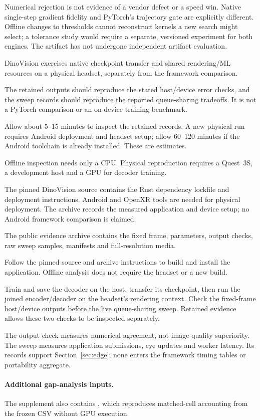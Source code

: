 Numerical rejection is not evidence of a vendor defect or a speed win.
Native single-step gradient fidelity and PyTorch's trajectory gate are
explicitly different. Offline changes to thresholds cannot reconstruct
kernels a new search might select; a tolerance study would require a separate,
versioned experiment for both engines. The artifact has not undergone
independent artifact evaluation.

\newartifact

\artrel
DinoVision exercises native checkpoint transfer and shared rendering/ML
resources on a physical headset, separately from the framework comparison.

\artexp
The retained outputs should reproduce the stated host/device error checks,
and the sweep records should reproduce the reported queue-sharing tradeoffs.
It is not a PyTorch comparison or an on-device training benchmark.

\arttime
Allow about 5--15 minutes to inspect the retained records. A new physical
run requires Android deployment and headset setup; allow 60--120 minutes
if the Android toolchain is already installed. These are estimates.

\artin

Offline inspection needs only a CPU. Physical reproduction requires a
Quest~3S, a development host and a GPU for decoder training.

The pinned DinoVision source contains the Rust dependency lockfile and
deployment instructions. Android and OpenXR tools are needed for physical
deployment. The archive records the measured application and device setup;
no Android framework comparison is claimed.

The public evidence archive contains the fixed frame, parameters, output
checks, raw sweep samples, manifests and full-resolution media.

Follow the pinned source and archive instructions to build and install the
application. Offline analysis does not require the headset or a new build.

\artcomp
Train and save the decoder on the host, transfer its checkpoint, then run
the joined encoder/decoder on the headset's rendering context.
Check the fixed-frame host/device outputs before the live queue-sharing
sweep. Retained evidence allows these two checks to be inspected separately.

\artout
The output check measures numerical agreement, not image-quality superiority.
The sweep measures application submissions, eye updates and worker latency.
Its records support Section~\ref{sec:edge}; none enters the framework timing
tables or portability aggregate.

\paragraph{Additional gap-analysis inputs.}
The supplement also contains , which reproduces
matched-cell accounting from the frozen CSV without GPU execution.
